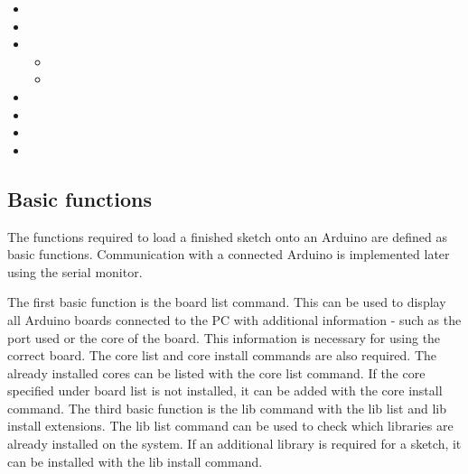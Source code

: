 \begin{itemize}
\begin{itemize}
        \item {}
        \item {}
        \item {}
        \item {}
        \item {}
        \item {}
        \item {}
        \item {}
        \item {}
    \end{itemize}
    \item {}
    \item {}
    \item {}
    \begin{itemize}
        \item {}
        \item {}
    \end{itemize}
    \item {}
    \item {}
    \item {}
    \item {}
\end{itemize}

\subsection{Basic functions}

The functions required to load a finished sketch onto an Arduino are defined as basic functions. Communication with a connected Arduino is implemented later using the serial monitor.

\bigskip
The first basic function is the board list command. This can be used to display all Arduino boards connected to the PC with additional information - such as the port used or the core of the board. This information is necessary for using the correct board.
The core list and core install commands are also required. The already installed cores can be listed with the core list command. If the core specified under board list is not installed, it can be added with the core install command.
The third basic function is the lib command with the lib list and lib install extensions. The lib list command can be used to check which libraries are already installed on the system. If an additional library is required for a sketch, it can be installed with the lib install command.

